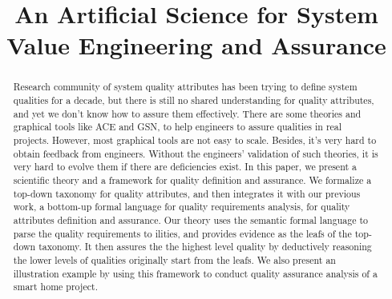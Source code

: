 \documentclass[conference]{IEEEtran}
\begin{document}
%
\title{An Artificial Science for System Value Engineering and Assurance}

\author{
\and
{}
\and
{}
}


\maketitle
\begin{abstract}
Research community of system quality attributes has been trying to define system qualities for a decade, but there is still no shared understanding for quality attributes, and yet we don't know how to assure them effectively. There are some theories and graphical tools like ACE and GSN, to help engineers to assure qualities in real projects. However, most graphical tools are not easy to scale. Besides, it's very hard to obtain feedback from engineers. Without the engineers' validation of such theories, it is very hard to evolve them if there are deficiencies exist. In this paper, we present a scientific theory and a framework for quality definition and assurance. We formalize a top-down taxonomy for quality attributes, and then integrates it with our previous work, a bottom-up formal language for quality requirements analysis, for quality attributes definition and assurance. Our theory uses the semantic formal language to parse the quality requirements to ilities, and provides evidence as the leafs of the top-down taxonomy. It then assures the the highest level quality by deductively reasoning the lower levels of qualities originally start from the leafs. We also present an illustration example by using this framework to conduct quality assurance analysis of a smart home project.
\end{abstract}
\end{document}
